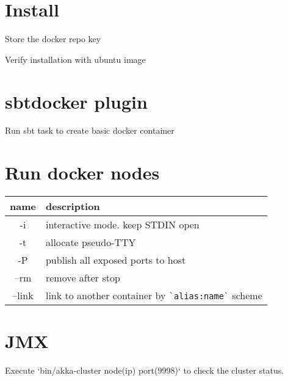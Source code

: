 \section*{Install}
Store the docker repo key


Verify installation with ubuntu image

\section*{sbt\-docker plugin}

Run sbt task to create basic docker container

\section*{Run docker nodes}

\begin{tabular}{|c|l|}
\hline
name & description\\ \hline
-i & interactive mode. keep STDIN open\\
-t & allocate pseudo-TTY\\
-P & publish all exposed ports to host\\
--rm & remove after stop\\
--link & link to another container by \lstinline|`alias:name`| scheme\\
\hline
\end{tabular}

\section*{JMX}

Execute `bin/akka-cluster node(ip) port(9998)` to check the cluster status.
